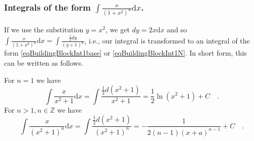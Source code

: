 \documentclass[12pt]{book}
\newcommand{\diff}{\text{d}}
\begin{document}
\subsubsection{Integrals of the form $\displaystyle\int \frac{x}{(1+x ^2)^n} \diff x $.}
If we use the substitution $y=x^2$, we get $dy=2x\diff x $ and so $\displaystyle\int \frac{x}{(1+x ^2)^n} \diff x = \displaystyle\int \frac{\frac12 dy}{(y+1)^n} $, i.e., our integral is transformed to an integral of the form \eqref{eqBuildingBlockInt1base} or  \eqref{eqBuildingBlockInt1N}. In short form, this can be written as follows. 

For $n=1$ we have
\[
\int \frac{x}{x^2+1}\diff x= \int \frac{\frac{1}2 d(x^2+1)}{x^2+1}= \frac{1}{2}\ln (x^2+1) +C\quad .
\]
For $n>1, n\in \mathbb Z$ we have
\[
\int \frac{x}{(x^2+1)^n}\diff x= \int \frac{\frac{1}2d(x^2+1)}{(x^2+1)^n}= -\frac{1}{2(n-1)(x+a)^{n-1} } +C\quad .
\]
\end{document}
